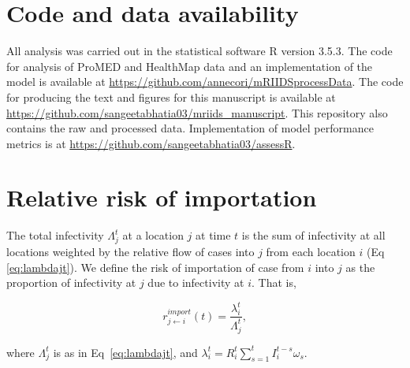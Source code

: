 \documentclass[9pt,twocolumn,twoside,lineno]{pnas-new}
\begin{document}
{\section*{Code and data availability}
All analysis was carried out in the statistical software R version
3.5.3. The code for analysis of ProMED and HealthMap data and an
implementation of the model is available at
\url{https://github.com/annecori/mRIIDSprocessData}. The code for
producing the text and figures for this manuscript is available at
\url{https://github.com/sangeetabhatia03/mriids_manuscript}. This
repository also contains the raw and processed data. Implementation
of model performance metrics is at
\url{https://github.com/sangeetabhatia03/assessR}.

\section*{Relative risk of
  importation}\label{relative-risk-of-importation}

The total infectivity $\Lambda_{j}^{t}$ at a location $j$ at time $t$ is the sum of
infectivity at all locations weighted by the relative flow of cases
into $j$ from each location $i$ (Eq \ref{eq:lambdajt}). We define the risk of
importation of case from $i$ into $j$ as the proportion of infectivity
at $j$ due to infectivity at $i$. That is, 

\begin{equation*}
r_{j \leftarrow i}^{import}(t) = \frac{\lambda_i^t}{\Lambda_j^t},
\end{equation*}

where $\Lambda_j^t$ is as in Eq~\ref{eq:lambdajt}, and
$\lambda_i^t = R_{i}^{t} \sum\limits_{s =1}^{t} {I_{i}^{t - s}\omega_{s}}$.

} %

\showmatmethods{} %


\showacknow{} %


\end{document}
